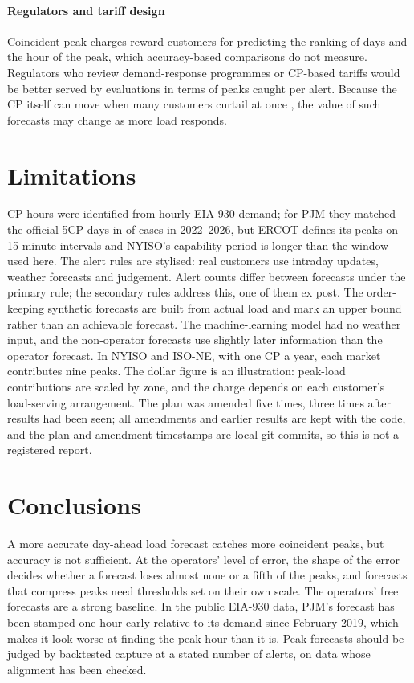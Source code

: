 \documentclass[preprint,12pt,authoryear]{elsarticle}
\begin{document}
\paragraph{Regulators and tariff design} Coincident-peak charges reward customers for predicting the ranking of days and the hour of the peak, which accuracy-based comparisons do not measure. Regulators who review demand-response programmes or CP-based tariffs would be better served by evaluations in terms of peaks caught per alert. Because the CP itself can move when many customers curtail at once \citep{zhang2026cp}, the value of such forecasts may change as more load responds.

\section{Limitations}

CP hours were identified from hourly EIA-930 demand; for PJM they matched the official 5CP days in  of  cases in 2022--2026, but ERCOT defines its peaks on 15-minute intervals and NYISO's capability period is longer than the window used here. The alert rules are stylised: real customers use intraday updates, weather forecasts and judgement. Alert counts differ between forecasts under the primary rule; the secondary rules address this, one of them ex post. The order-keeping synthetic forecasts are built from actual load and mark an upper bound rather than an achievable forecast. The machine-learning model had no weather input, and the non-operator forecasts use slightly later information than the operator forecast. In NYISO and ISO-NE, with one CP a year, each market contributes nine peaks. The dollar figure is an illustration: peak-load contributions are scaled by zone, and the charge depends on each customer's load-serving arrangement. The plan was amended five times, three times after results had been seen; all amendments and earlier results are kept with the code, and the plan and amendment timestamps are local git commits, so this is not a registered report.

\section{Conclusions}

A more accurate day-ahead load forecast catches more coincident peaks, but accuracy is not sufficient. At the operators' level of error, the shape of the error decides whether a forecast loses almost none or a fifth of the peaks, and forecasts that compress peaks need thresholds set on their own scale. The operators' free forecasts are a strong baseline. In the public EIA-930 data, PJM's forecast has been stamped one hour early relative to its demand since February 2019, which makes it look worse at finding the peak hour than it is. Peak forecasts should be judged by backtested capture at a stated number of alerts, on data whose alignment has been checked.
\end{document}
